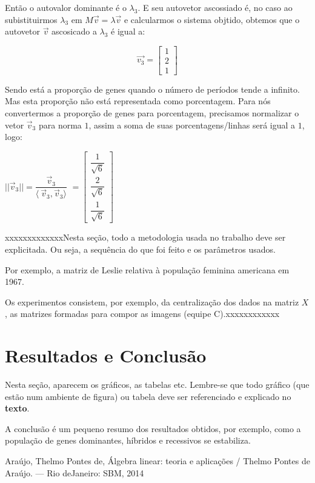 \documentclass[a4paper,12pt]{article}
\begin{document}
Então o autovalor dominante é o $\lambda_3$. E seu autovetor ascossiado é, no caso ao subistituirmos $\lambda_3$ em $M\vec{v} = \lambda \vec{v}$ e calcularmos o sistema objtido, obtemos que o autovetor $\vec{v}$ ascosicado a $\lambda_3$ é igual a:

\begin{displaymath}
\vec{v_3} = \begin{bmatrix}
1\\
2\\
1
\end{bmatrix}
\end{displaymath}

Sendo está a proporção de genes quando o número de períodos tende a infinito.
Mas esta proporção não está representada como porcentagem. Para nós convertermos a proporção de genes para porcentagem, precisamos normalizar o vetor $\vec{v}_3$ para norma $1$, assim a soma de suas porcentagens/linhas será igual a $1$, logo:
\begin{center}
    $||\vec{v}_3|| = \dfrac{\vec{v}_3}{\langle\ \vec{v}_3,\vec{v}_3 \rangle}$
    $ = \begin{bmatrix} \dfrac{1}{\sqrt{6}}\\ \dfrac{2}{\sqrt{6}}\\ \dfrac{1}{\sqrt{6}} \end{bmatrix}$
\end{center}




xxxxxxxxxxxxxNesta seção, todo a metodologia usada no trabalho deve ser explicitada. Ou seja, a sequência do que foi feito e os parâmetros usados.

Por exemplo, a matriz de Leslie relativa à população feminina americana em 1967.

Os experimentos consistem, por exemplo, da centralização dos dados na matriz $X$, as matrizes formadas para compor as imagens (equipe C).xxxxxxxxxxxx



\section{Resultados e Conclusão}
\label{sec:resultados}

Nesta seção, aparecem os gráficos, as tabelas etc. Lembre-se que todo gráfico (que estão num ambiente de figura) ou tabela deve ser referenciado e explicado no \textbf{texto}.

A conclusão é um pequeno resumo dos resultados obtidos, por exemplo, como a população de genes dominantes, híbridos e recessivos se estabiliza.


% 

Araújo, Thelmo Pontes de, Álgebra linear: teoria e aplicações / Thelmo Pontes de Araújo. — Rio deJaneiro: SBM, 2014
\end{document}
